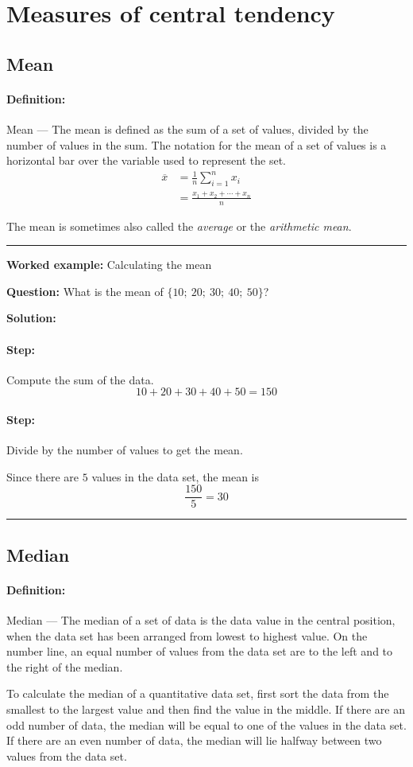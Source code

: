 \documentclass[a4paper,11pt]{report}
\def\Definition#1#2{\paragraph{Definition:} #1 --- #2}
\newenvironment{wex}[3]%
{\rule{\linewidth}{0.5mm}
\textbf{Worked example:} #1

\textbf{Question:} #2

\textbf{Solution:} #3}%
{\rule{\linewidth}{0.5mm}}
\newcommand{\westep}[1]{\paragraph{Step:} #1}
\begin{document}
\section{Measures of central tendency}

\subsection{Mean}
\Definition{Mean}{The mean is defined as the sum of a set of values,
  divided by the number of values in the sum.  The notation for the
  mean of a set of values is a horizontal bar over the variable used
  to represent the set.
  \begin{align}
    \overline{x} &= \frac{1}{n}\sum_{i=1}^n x_i \\
    &= \frac{x_1 + x_2 + \cdots + x_n}{n}
  \end{align}
}

The mean is sometimes also called the {\em average} or the {\em
  arithmetic mean}.

\begin{wex}{Calculating the mean}{
    What is the mean of $\{10;\ 20;\ 30;\ 40;\ 50\}$?
}{
  \westep{Compute the sum of the data.}
  \begin{equation}
    10 + 20 + 30 + 40 + 50 = 150
  \end{equation}

  \westep{Divide by the number of values to get the mean.}

  Since there are $5$ values in the data set, the mean is
  \begin{equation}
    \frac{150}{5} = 30
  \end{equation}
}
\end{wex}

\subsection{Median}
\Definition{Median}{
  The median of a set of data is the data value in the central
  position, when the data set has been arranged from lowest to highest
  value. On the number line, an equal number of values from the data
  set are to the left and to the right of the median.}

To calculate the median of a quantitative data set, first sort the
data from the smallest to the largest value and then find the value in
the middle. If there are an odd number of data, the median will be
equal to one of the values in the data set. If there are an even
number of data, the median will lie halfway between two values from
the data set.
\end{document}
